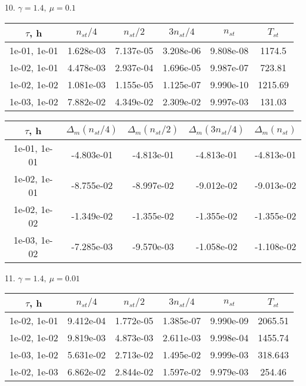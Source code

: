 10. $\gamma = 1.4, \ \mu = 0.1$
\begin{center}
	\begin{tabular}{ |c|c|c|c|c|c| } 
		\hline
		$\tau$, h & $n_{st}/ 4$ & $n_{st}/ 2$ & $3n_{st}/ 4$ & $n_{st}$ & $T_{st}$ \\ 
		\hline
		1e-01, 1e-01 & 1.628e-03 & 7.137e-05 & 3.208e-06 & 9.808e-08 & 1174.5\\ 
		\hline
		1e-02, 1e-01 & 4.478e-03 & 2.937e-04 & 1.696e-05 & 9.987e-07 & 723.81\\ 
		\hline
		1e-02, 1e-02 & 1.081e-03 & 1.155e-05 & 1.125e-07 & 9.990e-10 & 1215.69\\ 
		\hline
		1e-03, 1e-02 & 7.882e-02 & 4.349e-02 & 2.309e-02 & 9.997e-03 & 131.03\\ 
		\hline
	\end{tabular}
\end{center}

\begin{center}
	\begin{tabular}{ |c|c|c|c|c| } 
		\hline
		$\tau$, h & $\Delta_m (n_{st}/ 4)$ & $\Delta_m (n_{st}/ 2)$ & $\Delta_m (3n_{st}/ 4)$ & $\Delta_m (n_{st})$ \\ 
		\hline
		1e-01, 1e-01 & -4.803e-01 & -4.813e-01 & -4.813e-01 & -4.813e-01 \\ 
		\hline
		1e-02, 1e-01 & -8.755e-02 & -8.997e-02 & -9.012e-02 & -9.013e-02 \\ 
		\hline
		1e-02, 1e-02 & -1.349e-02 & -1.355e-02 & -1.355e-02 & -1.355e-02 \\ 
		\hline
		1e-03, 1e-02 & -7.285e-03 & -9.570e-03 & -1.058e-02 & -1.108e-02 \\ 
		\hline
	\end{tabular}
\end{center}

11. $\gamma = 1.4, \ \mu = 0.01$
\begin{center}
	\begin{tabular}{ |c|c|c|c|c|c| } 
		\hline
		$\tau$, h & $n_{st}/ 4$ & $n_{st}/ 2$ & $3n_{st}/ 4$ & $n_{st}$ & $T_{st}$ \\ 
		\hline
		1e-02, 1e-01 & 9.412e-04 & 1.772e-05 & 1.385e-07 & 9.990e-09 & 2065.51\\ 
		\hline
		1e-02, 1e-02 & 9.819e-03 & 4.873e-03 & 2.611e-03 & 9.998e-04 & 1455.74\\ 
		\hline
		1e-03, 1e-02 & 5.631e-02 & 2.713e-02 & 1.495e-02 & 9.999e-03 & 318.643\\ 
		\hline
		1e-02, 1e-03 & 6.862e-02 & 2.844e-02 & 1.597e-02 & 9.979e-03 & 254.46\\ 
		\hline
	\end{tabular}
\end{center}


